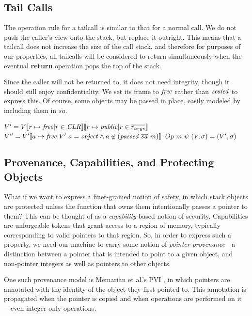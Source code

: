 \documentclass[10pt,conference]{ieeetran}%
\theoremstyle{definition}
\begin{document}
\subsection{Tail Calls}

The operation rule for a tailcall is similar to that for a normal call.
We do not push the caller's view onto the stack,
but replace it outright. This means that a tailcall does not increase the size of
the call stack, and therefore for purposes of our properties, all tailcalls will
be considered to return simultaneously when the eventual {\bf return} operation
pops the top of the stack.

Since the caller will not be returned to, it does not need integrity, though
it should still enjoy confidentiality. We set its frame to \(\mathit{free}\) rather
than \(\mathit{sealed}\) to express this. Of course, some objects may be passed in place,
easily modeled by including them in \(\overline{sa}\).

             {\(V' = V \llbracket r \mapsto \mathit{free} | r \in \mathit{CLR} \rrbracket
               \llbracket r \mapsto \mathit{public} | r \in \overline{r_{args}} \rrbracket\)}
             {\(V'' = V'\llbracket a \mapsto \mathit{free} | V' ~ a = \mathit{object} \land a \not \in (\mathit{passed} ~ \overline{sa} ~ m) \rrbracket\)}
             {\(Op ~ m ~ \psi ~ (V,\sigma) =
               (V',\sigma)\)}
             
\subsection{Provenance, Capabilities, and Protecting Objects}

What if we want to express a finer-grained notion of safety, in which
stack objects are protected unless the function that owns them intentionally
passes a pointer to them? This can be thought of as a {\it capability}-based
notion of security. Capabilities are unforgeable tokens that grant access to
a region of memory, typically corresponding to valid pointers to that region.
So, in order to express such a property, we need our machine to carry some notion
of {\it pointer provenance}---a distinction between a pointer that is intended to
point to a given object, and non-pointer integers as well as pointers to other objects.

One such provenance model is Memarian et al.'s PVI \cite{}, in which pointers are
annotated with the identity of the object they first pointed to. This annotation is
propagated when the pointer is copied and when operations are performed on it---even
integer-only operations.
\end{document}
